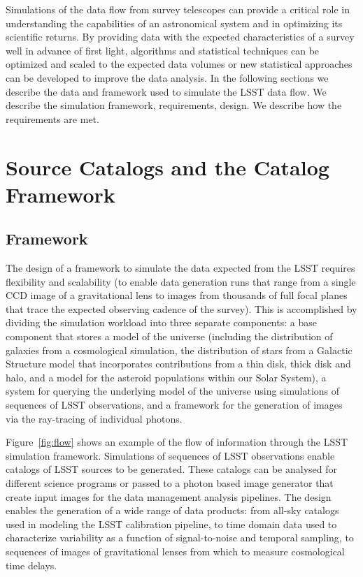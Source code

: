 \documentclass[]{article}
\begin{document}
Simulations of the data flow from survey telescopes can provide a
critical role in understanding the capabilities of an astronomical
system and in optimizing its scientific returns. By providing data
with the expected characteristics of a survey well in advance of first
light, algorithms and statistical techniques can be optimized and
scaled to the expected data volumes or new statistical approaches can
be developed to improve the data analysis. 
In the following sections we describe the data and framework used to 
simulate the LSST data flow.  We describe the simulation framework, 
requirements, design.  We describe how the requirements are met.

\section{Source Catalogs and the Catalog Framework}

\subsection{Framework}


The design of a framework \cite{connolly10} to simulate the data
expected from the LSST requires flexibility and scalability (to enable
data generation runs that range from a single CCD image of a
gravitational lens to images from thousands of full focal planes that
trace the expected observing cadence of the survey). This is
accomplished by dividing the simulation workload into three separate
components: a base component that stores a model of the universe
(including the distribution of galaxies from a cosmological
simulation, the distribution of stars from a Galactic Structure model
that incorporates contributions from a thin disk, thick disk and halo,
and a model for the asteroid populations within our Solar System), a
system for querying the underlying model of the universe using
simulations of sequences of LSST observations, and a framework for the
generation of images via the ray-tracing of individual photons. 


Figure~\ref{fig:flow} shows an example of the flow of information
through the LSST simulation framework. Simulations of sequences of
LSST observations enable catalogs of LSST sources to be
generated. These catalogs can be analysed for different science
programs or passed to a photon based image generator that create input
images for the data management analysis pipelines.  The design enables
the generation of a wide range of data products: from all-sky catalogs
used in modeling the LSST calibration pipeline, to time domain data
used to characterize variability as a function of signal-to-noise and
temporal sampling, to sequences of images of gravitational lenses from
which to measure cosmological time delays.
\end{document}
